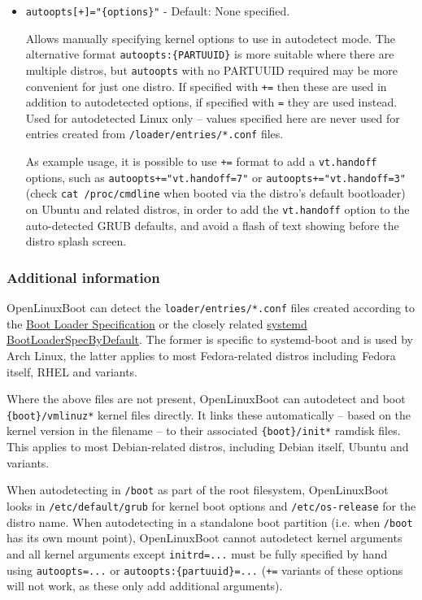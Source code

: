 \documentclass[]{article}
\begin{document}
\begin{itemize}
	\item \texttt{autoopts[+]="\{options\}"} - Default: None specified. \medskip

  Allows manually specifying kernel options to use in autodetect mode. The alternative format \texttt{autoopts:\{PARTUUID\}}
  is more suitable where there are multiple distros, but \texttt{autoopts} with no PARTUUID required may be more
  convenient for just one distro.
  If specified with \texttt{+=} then these are used in addition to autodetected options, if specified
  with \texttt{=} they are used instead. Used for autodetected Linux only -- values specified here are never
  used for entries created from \texttt{/loader/entries/*.conf} files.
  \medskip

  As example usage, it is possible to use \texttt{+=} format to add
  a \texttt{vt.handoff} options, such as \texttt{autoopts+="vt.handoff=7"} or \texttt{autoopts+="vt.handoff=3"}
  (check \texttt{cat /proc/cmdline} when booted via the distro's default bootloader) on Ubuntu and related distros,
  in order to add the \texttt{vt.handoff} option to the auto-detected GRUB defaults, and avoid a flash of text
  showing before the distro splash screen.
  \medskip
\end{itemize}

\subsubsection{Additional information}

OpenLinuxBoot can detect the \texttt{loader/entries/*.conf} files created according to the
\href{https://systemd.io/BOOT_LOADER_SPECIFICATION/}{Boot Loader Specification} or the closely related
\href{https://fedoraproject.org/wiki/Changes/BootLoaderSpecByDefault}{systemd BootLoaderSpecByDefault}. The
former is specific to systemd-boot and is used by Arch Linux, the latter applies to most Fedora-related distros
including Fedora itself, RHEL and variants.

Where the above files are not present, OpenLinuxBoot can autodetect and
boot \texttt{\{boot\}/vmlinuz*} kernel files directly. It links these automatically -- based on the
kernel version in the filename -- to their associated \texttt{\{boot\}/init*} ramdisk files.
This applies to most Debian-related distros, including Debian itself, Ubuntu and variants.

When autodetecting in \texttt{/boot} as part of the root filesystem, OpenLinuxBoot looks in \texttt{/etc/default/grub}
for kernel boot options and \texttt{/etc/os-release} for the distro name. When autodetecting in a standalone boot
partition (i.e. when \texttt{/boot} has its own mount point), OpenLinuxBoot cannot autodetect kernel arguments and
all kernel arguments except \texttt{initrd=...} must be fully specified by hand using \texttt{autoopts=...} or
\texttt{autoopts:\{partuuid\}=...} (\texttt{+=} variants of these options will not work, as these only add additional
arguments).
\end{document}
